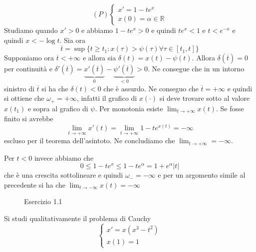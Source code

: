 \begin{eser}
    \[
        (P) \begin{cases}
            x' = 1-te^{x} \\
            x(0) = \alpha \in \mathbb{R}
        \end{cases}
    \]
     Studiamo quando \(x' > 0\) e abbiamo \(1 - te^{x}> 0\) e quindi \(te^{x}<1\)
     e \(t < e^{-x}\) e quindi \(x < -\log t\).
     Sia ora 
     \[
         \overline{t} = \sup \{t \ge t_{1} : x(\tau) > \psi {(\tau)} \forall \tau
         \in [t_{1}, t]\} 
     \]
    Supponiamo ora \(\overline{t} < +\infty\) e allora sia \(\delta(t) =
    x{(t)}-\psi {(t)}\). Allora \(\delta {(\overline{t})}=0\) per continuità e
    \(\delta'{(\overline{t})} = \underbrace{x'{(\overline{t})}}_{0}  -
    \underbrace{\psi'{(\overline{t})}}_{<0} > 0\). Ne consegue che in un intorno
    sinistro di \(\overline{t}\) si ha che \(\delta(t) < 0\) che è assurdo. Ne
    conseguo che \(\overline{t} = +\infty\) e quindi si ottiene che \(\omega_+ =
    +\infty\), infatti il grafico di \(x{(\cdot )}\) si deve trovare sotto al
    valore \(x{(t_{1})}\) e sopra al grafico di \(\psi\). Per monotonia esiste
    \(\lim_{t\to +\infty} x{(t)}\). Se fosse finito si avrebbe
    \[
        \lim_{t\to +\infty} x'{(t)} = \lim_{t \to +\infty} 1 - te^{x{(t)}} =
        -\infty
    \]
    escluso per il teorema dell'asintoto. Ne concludiamo che \(\lim_{t\to
    +\infty} = -\infty\).

    Per \(t < 0\) invece abbiamo che
    \[
        0 \le 1-te^{x} \le 1 - t e^{\alpha} = 1 + e^{\alpha} |t|
    \]
    che è una crescita sottolineare e quindi \(\omega_- = -\infty\) e per un
    argomento simile al precedente si ha che \(\lim_{t \to -\infty} x{(t)} =
    -\infty\)
\end{eser}
\begin{figure}[ht]
    \centering
    \caption{Esercizio 1.1}\label{fig:eser1}
\end{figure}
\begin{eser}
    Si studi qualitativamente il problema di Cauchy
    \[
        \begin{cases}
            x' = x{(x^3-t^2)} \\
            x{(1)}=1
        \end{cases}
   \]
\end{eser}

